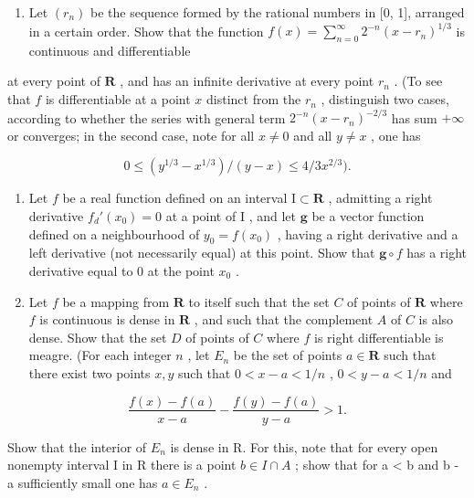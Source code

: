\begin{enumerate}
\def\labelenumi{\arabic{enumi})}
\setcounter{enumi}{5}
\tightlist
\item
  Let \((r_n)\) be the sequence formed by the rational numbers in {[}0, 1{]}, arranged in a certain order. Show that the function \(f(x) = \sum_{n=0}^{\infty} 2^{-n}(x - r_n)^{1/3}\) is continuous and differentiable
\end{enumerate}

at every point of \(\mathbf{R}\) , and has an infinite derivative at every point \(r_n\) . (To see that \(f\) is differentiable at a point \(x\) distinct from the \(r_n\) , distinguish two cases, according to whether the series with general term \(2^{-n}(x - r_n)^{-2/3}\) has sum \(+\infty\) or converges; in the second case, note for all \(x \neq 0\) and all \(y \neq x\) , one has

\[
0 \leqslant (y ^ {1 / 3} - x ^ {1 / 3}) / (y - x) \leqslant 4 / 3 x ^ {2 / 3}).
\]

\begin{enumerate}
\def\labelenumi{\arabic{enumi})}
\setcounter{enumi}{6}
\item
  Let \(f\) be a real function defined on an interval \(\mathrm{I} \subset \mathbf{R}\) , admitting a right derivative \(f_d'(x_0) = 0\) at a point of \(\mathrm{I}\) , and let \(\mathbf{g}\) be a vector function defined on a neighbourhood of \(y_0 = f(x_0)\) , having a right derivative and a left derivative (not necessarily equal) at this point. Show that \(\mathbf{g} \circ f\) has a right derivative equal to 0 at the point \(x_0\) .
\item
  Let \(f\) be a mapping from \(\mathbf{R}\) to itself such that the set \(C\) of points of \(\mathbf{R}\) where \(f\) is continuous is dense in \(\mathbf{R}\) , and such that the complement \(A\) of \(C\) is also dense. Show that the set \(D\) of points of \(C\) where \(f\) is right differentiable is meagre. (For each integer \(n\) , let \(E_n\) be the set of points \(a \in \mathbf{R}\) such that there exist two points \(x, y\) such that \(0 < x - a < 1/n\) , \(0 < y - a < 1/n\) and
\end{enumerate}

\[
\frac {f (x) - f (a)}{x - a} - \frac {f (y) - f (a)}{y - a} > 1.
\]

Show that the interior of \(E_{n}\) is dense in R. For this, note that for every open nonempty interval I in R there is a point \(b \in I \cap A\) ; show that for a \textless{} b and b - a sufficiently small one has \(a \in E_{n}\) .

